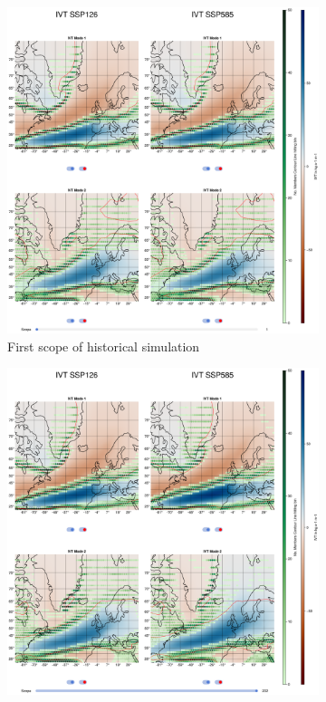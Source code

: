 \begin{figure}[htb]
\centering 
  \begin{subfigure}[b]{0.49\textwidth}
        \includegraphics[width=\textwidth]{figures/ivt_eof_2modes_historical.png}
    \caption{First scope of historical simulation}
    \label{fig:ivt spatial patterns historical}
  \end{subfigure}
  \hfill
  \begin{subfigure}[b]{0.49\textwidth}
        \includegraphics[width=\textwidth]{figures/ivt_eof_2modes_endscenario.png}

\end{subfigure}
\end{figure}
